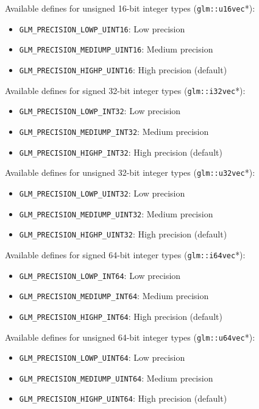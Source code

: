 \documentclass{scrartcl}
\numberwithin{figure}{subsection}
\begin{document}
Available defines for unsigned 16-bit integer types (\verb|glm::u16vec|*):

\begin{itemize}
    \item \verb|GLM_PRECISION_LOWP_UINT16|: Low precision
    \item \verb|GLM_PRECISION_MEDIUMP_UINT16|: Medium precision 
    \item \verb|GLM_PRECISION_HIGHP_UINT16|: High precision (default)
\end{itemize}

Available defines for signed 32-bit integer types (\verb|glm::i32vec|*):

\begin{itemize}
    \item \verb|GLM_PRECISION_LOWP_INT32|: Low precision
    \item \verb|GLM_PRECISION_MEDIUMP_INT32|: Medium precision
    \item \verb|GLM_PRECISION_HIGHP_INT32|: High precision (default)
\end{itemize}

Available defines for unsigned 32-bit integer types (\verb|glm::u32vec|*):

\begin{itemize}
    \item \verb|GLM_PRECISION_LOWP_UINT32|: Low precision
    \item \verb|GLM_PRECISION_MEDIUMP_UINT32|: Medium precision
    \item \verb|GLM_PRECISION_HIGHP_UINT32|: High precision (default)
\end{itemize}

Available defines for signed 64-bit integer types (\verb|glm::i64vec|*):

\begin{itemize}
    \item \verb|GLM_PRECISION_LOWP_INT64|: Low precision
    \item \verb|GLM_PRECISION_MEDIUMP_INT64|: Medium precision
    \item \verb|GLM_PRECISION_HIGHP_INT64|: High precision (default)
\end{itemize}

Available defines for unsigned 64-bit integer types (\verb|glm::u64vec|*):

\begin{itemize}
    \item \verb|GLM_PRECISION_LOWP_UINT64|: Low precision
    \item \verb|GLM_PRECISION_MEDIUMP_UINT64|: Medium precision
    \item \verb|GLM_PRECISION_HIGHP_UINT64|: High precision (default)
\end{itemize}
\end{document}
